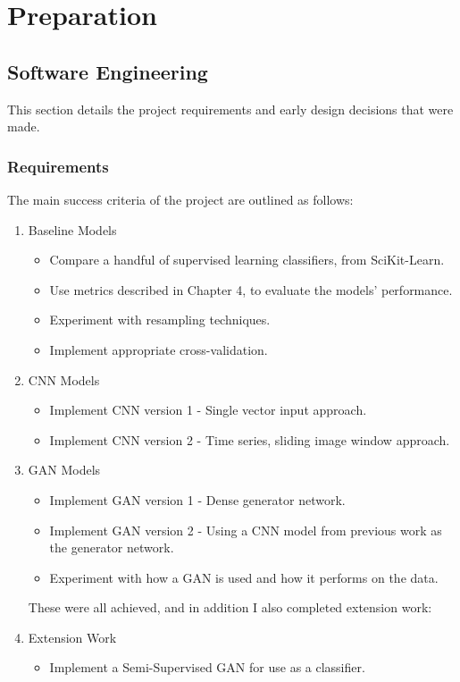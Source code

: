 \documentclass[12pt,a4paper,twoside]{report}
\begin{document}
\chapter{Preparation} \label{preparation}

\section{Software Engineering}

This section details the project requirements and early design decisions that were made.

\subsection{Requirements}
The main success criteria of the project are outlined as follows:

\begin{enumerate}
   \item Baseline Models
   \begin{itemize}
     \item Compare a handful of supervised learning classifiers, from SciKit-Learn.
     \item Use metrics described in Chapter 4, to evaluate the models' performance.
     \item Experiment with resampling techniques. 
     \item Implement appropriate cross-validation.
   \end{itemize}
   \item CNN Models
   \begin{itemize}
     \item Implement CNN version 1 - Single vector input approach.
     \item Implement CNN version 2 - Time series, sliding image window approach.
   \end{itemize}
   \item GAN Models
   \begin{itemize}
     \item Implement GAN version 1 - Dense generator network.
     \item Implement GAN version 2 - Using a CNN model from previous work as the generator network.
     \item Experiment with how a GAN is used and how it performs on the data.
   \end{itemize}

These were all achieved, and in addition I also completed extension work:

   \item Extension Work
   \begin{itemize}
     \item Implement a Semi-Supervised GAN for use as a classifier.
   \end{itemize}

\end{enumerate}
\end{document}
